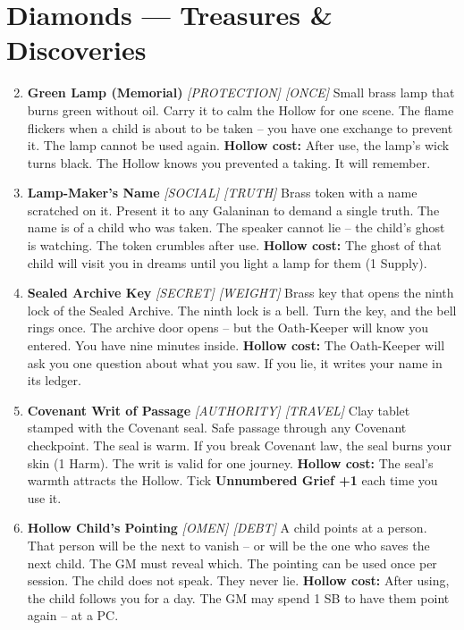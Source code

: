 \section*{Diamonds --- Treasures \& Discoveries}
\label{sec:galanina-rewards}
\begin{enumerate}
\setcounter{enumi}{1}
\item \textbf{Green Lamp (Memorial)} \hfill \textit{[PROTECTION] [ONCE]}  
  Small brass lamp that burns green without oil. Carry it to calm the Hollow for one scene. The flame flickers when a child is about to be taken -- you have one exchange to prevent it. The lamp cannot be used again.  
  \textbf{Hollow cost:} After use, the lamp's wick turns black. The Hollow knows you prevented a taking. It will remember.

\item \textbf{Lamp-Maker's Name} \hfill \textit{[SOCIAL] [TRUTH]}  
  Brass token with a name scratched on it. Present it to any Galaninan to demand a single truth. The name is of a child who was taken. The speaker cannot lie -- the child's ghost is watching. The token crumbles after use.  
  \textbf{Hollow cost:} The ghost of that child will visit you in dreams until you light a lamp for them (1 Supply).

\item \textbf{Sealed Archive Key} \hfill \textit{[SECRET] [WEIGHT]}  
  Brass key that opens the ninth lock of the Sealed Archive. The ninth lock is a bell. Turn the key, and the bell rings once. The archive door opens -- but the Oath-Keeper will know you entered. You have nine minutes inside.  
  \textbf{Hollow cost:} The Oath-Keeper will ask you one question about what you saw. If you lie, it writes your name in its ledger.

\item \textbf{Covenant Writ of Passage} \hfill \textit{[AUTHORITY] [TRAVEL]}  
  Clay tablet stamped with the Covenant seal. Safe passage through any Covenant checkpoint. The seal is warm. If you break Covenant law, the seal burns your skin (1 Harm). The writ is valid for one journey.  
  \textbf{Hollow cost:} The seal's warmth attracts the Hollow. Tick \textbf{Unnumbered Grief +1} each time you use it.

\item \textbf{Hollow Child's Pointing} \hfill \textit{[OMEN] [DEBT]}  
  A child points at a person. That person will be the next to vanish -- or will be the one who saves the next child. The GM must reveal which. The pointing can be used once per session. The child does not speak. They never lie.  
  \textbf{Hollow cost:} After using, the child follows you for a day. The GM may spend 1 SB to have them point again -- at a PC.


\end{enumerate}
